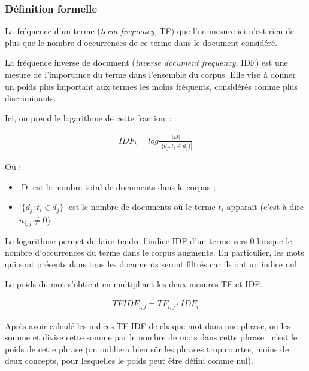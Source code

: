 \documentclass[a4paper, 12pt]{article}
\begin{document}
\subsubsection{Définition formelle}

\begin{definition}[TF]
 La fréquence d'un terme (\textit{term frequency}, TF) que l'on mesure ici n'est rien de plus que le nombre d'occurrences de ce terme dans le document considéré.
\end{definition}

\begin{definition}[IDF]
 La fréquence inverse de document (\textit{inverse document frequency}, IDF) est une mesure de l'importance du terme dans l'ensemble du corpus. Elle vise à donner un poids plus important aux termes les moins fréquents, considérés comme plus discriminants.
\end{definition}

Ici, on prend le logarithme de cette fraction~:

\begin{align}
 IDF_{i} =  log \frac{|D|}{|\{d_{j}: t_{i} \in d_{j}\}|}
\end{align}

Où : 
\begin{itemize}
 \item |D| est le nombre total de documents dans le corpus ;
 \item $|\{d_{j} : t_{i} \in d_{j}\}|$ est le nombre de documents où le terme  $t_{i}$  apparaît (c'est-à-dire  $n_{i,j} \neq 0$)
\end{itemize}
Le logarithme permet de faire tendre l'indice IDF d'un terme vers 0 lorsque le nombre d'occurrences du terme dans le corpus augmente. En particulier, les mots qui sont présents dans tous les documents seront filtrés car ils ont un indice nul.

\begin{definition}[TF-IDF]
Le poids du mot s'obtient en multipliant les deux mesures TF et IDF.
\end{definition}

\begin{align}
 TFIDF_{i,j} = TF_{i,j} \cdot  IDF_{i}
\end{align}

\begin{definition}
Après avoir calculé les indices TF-IDF de chaque mot dans une phrase, on les somme et divise cette somme par le nombre de mots dans cette phrase : c'est le poids de cette phrase (on oubliera bien sûr les phrases trop courtes, moins de deux concepts, pour lesquelles le poids peut être défini comme nul).
\end{definition}
\end{document}
